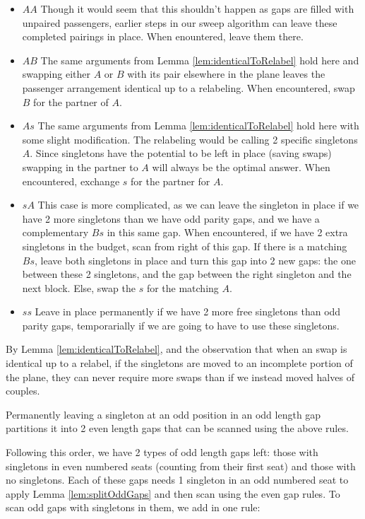 \documentclass[11pt,twocolumn]{article}
\begin{document}
\begin{itemize}
\item $AA$ 
Though it would seem that this shouldn't happen as gaps are filled with unpaired passengers, earlier steps in our sweep algorithm can leave these completed pairings in place.  When enountered, leave them there.
\item $AB$ 
The same arguments from Lemma \ref{lem:identicalToRelabel} hold here and swapping either $A$ or $B$ with its pair elsewhere in the plane leaves the passenger arrangement identical up to a relabeling.  When encountered, swap $B$ for the partner of $A$.
\item $As$
The same arguments from Lemma \ref{lem:identicalToRelabel} hold here with some slight modification. The relabeling would be calling 2 specific singletons $A$.  Since singletons have the potential to be left in place (saving swaps) swapping in the partner to $A$ will always be the optimal answer.  When encountered, exchange $s$ for the partner for $A$.
\item $sA$ 
This case is more complicated, as we can leave the singleton in place if we have 2 more singletons than we have odd parity gaps, and we have a complementary $Bs$ in this same gap.  When encountered, if we have 2 extra singletons in the budget, scan from right of this gap. If there is a matching $Bs$, leave both singletons in place and turn this gap into 2 new gaps: the one between these 2 singletons, and the gap between the right singleton and the next block.  Else, swap the $s$ for the matching $A$.
\item $ss$ 
Leave in place permanently if we have 2 more free singletons than odd parity gaps, temporarially if we are going to have to use these singletons.
\end{itemize}

By Lemma \ref{lem:identicalToRelabel}, and the observation that when an swap is identical up to a relabel, if the singletons are moved to an incomplete portion of the plane, they can never require more swaps than if we instead moved halves of couples.

\begin{lem} \label{lem:splitOddGaps}
Permanently leaving a singleton at an odd position in an odd length gap partitions it into 2 even length gaps that can be scanned using the above rules.
\end{lem}

Following this order, we have 2 types of odd length gaps left: those with singletons in even numbered seats (counting from their first seat) and those with no singletons.  Each of these gaps needs 1 singleton in an odd numbered seat to apply Lemma \ref{lem:splitOddGaps} and then scan using the even gap rules.  To scan odd gaps with singletons in them, we add in one rule:
\end{document}
